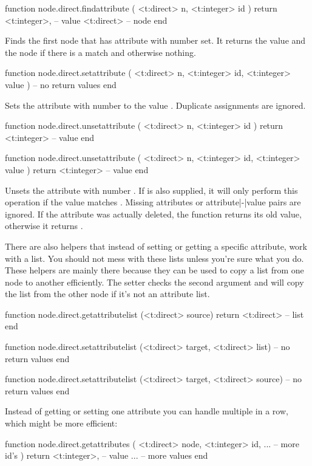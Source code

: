 \starttyping[option=LUA]
function node.direct.findattribute ( <t:direct> n, <t:integer> id )
    return
        <t:integer>, -- value
        <t:direct>   -- node
end
\stoptyping

Finds the first node that has attribute with number  set. It returns
the value and the node if there is a match and otherwise nothing.

\starttyping[option=LUA]
function node.direct.setattribute ( <t:direct> n, <t:integer> id, <t:integer> value )
    -- no return values
end
\stoptyping

Sets the attribute with number  to the value . Duplicate
assignments are ignored.

\starttyping[option=LUA]
function node.direct.unsetattribute ( <t:direct> n, <t:integer> id )
    return <t:integer> -- value
end

function node.direct.unsetattribute ( <t:direct> n, <t:integer> id, <t:integer> value )
    return <t:integer> -- value
end
\stoptyping

Unsets the attribute with number . If  is also supplied,
it will only perform this operation if the value matches . Missing
attributes or attribute|-|value pairs are ignored. If the attribute was actually
deleted, the function returns its old value, otherwise it returns .

There are also helpers that instead of setting or getting a specific attribute,
work with a list. You should not mess with these lists unless you're sure what
you do. These helpers are mainly there because they can be used to copy a list
from one node to another efficiently. The setter checks the second argument and
will copy the list from the other node if it's not an attribute list.

\starttyping[option=LUA]
function node.direct.getattributelist (<t:direct> source)
    return <t:direct> -- list
end

function node.direct.setattributelist (<t:direct> target, <t:direct> list)
    -- no return values
end

function node.direct.setattributelist (<t:direct> target, <t:direct> source)
    -- no return values
end
\stoptyping

Instead of getting or setting one attribute you can handle multiple in a row,
which might be more efficient:

\starttyping[option=LUA]
function node.direct.getattributes (
    <t:direct>  node,
    <t:integer> id,
    ...              -- more id's
)
    return
        <t:integer>, -- value
        ...          -- more values
end

